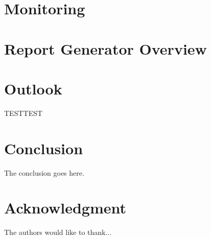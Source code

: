 \documentclass[journal]{IEEEtran}
\begin{document}
\section{Monitoring}







\section{Report Generator Overview}



\section{Outlook}



TESTTEST



\section{Conclusion}

The conclusion goes here.





\section*{Acknowledgment}

The authors would like to thank...





\printbibliography
\end{document}
